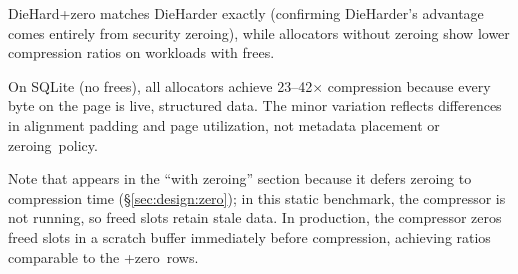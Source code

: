 DieHard+zero matches DieHarder exactly (confirming DieHarder's
advantage comes entirely from security zeroing), while allocators
without zeroing show lower compression ratios on workloads with
frees.

On SQLite (no frees), all allocators achieve 23--42$\times$
compression because every byte on the page is live, structured data.
The minor variation reflects differences in alignment padding and page
utilization, not metadata placement or zeroing~policy.

Note that \sys appears in the ``with zeroing'' section because
it defers zeroing to compression time (\S\ref{sec:design:zero});
in this static benchmark, the compressor is not running, so freed
slots retain stale data.  In production, the compressor zeros freed
slots in a scratch buffer immediately before compression, achieving
ratios comparable to the +zero~rows.
